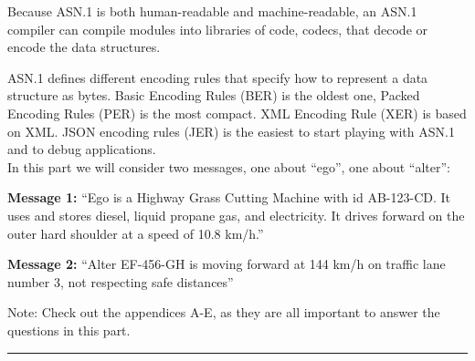 \documentclass[a4paper,10pt]{article}
\begin{document}
Because ASN.1 is both human-readable and machine-readable, an ASN.1 compiler can compile modules into libraries
of code, codecs, that decode or encode the data structures.

ASN.1 defines different encoding rules that specify how to represent a data structure as bytes. Basic Encoding Rules
(BER) is the oldest one, Packed Encoding Rules (PER) is the most compact. XML Encoding Rule (XER) is based on
XML. JSON encoding rules (JER) is the easiest to start playing with ASN.1 and to debug applications.\\

In this part we will consider two messages, one about “ego”, one about “alter”:

\textbf{Message 1:} “Ego is a Highway Grass Cutting Machine with id AB-123-CD. It uses and stores diesel, liquid propane
gas, and electricity. It drives forward on the outer hard shoulder at a speed of 10.8 km/h.”

\textbf{Message 2:} “Alter EF-456-GH is moving forward at 144 km/h on traffic lane number 3, not respecting safe distances”

Note: Check out the appendices A-E, as they are all important to answer the questions in this part.
\noindent\rule{\textwidth}{0.4mm} 
\end{document}
